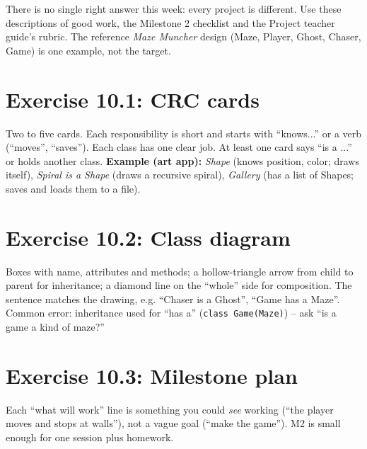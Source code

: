 
\begin{teachernote}
There is no single right answer this week: every project is different. Use these descriptions of good work, the Milestone 2 checklist and the Project teacher guide's rubric. The reference \emph{Maze Muncher} design (Maze, Player, Ghost, Chaser, Game) is one example, not the target.
\end{teachernote}

\section{Exercise 10.1: CRC cards}
\begin{answer}
Two to five cards. Each responsibility is short and starts with \enquote{knows...} or a verb (\enquote{moves}, \enquote{saves}). Each class has one clear job. At least one card says \enquote{is a ...} or holds another class. \textbf{Example (art app):} \emph{Shape} (knows position, color; draws itself), \emph{Spiral is a Shape} (draws a recursive spiral), \emph{Gallery} (has a list of Shapes; saves and loads them to a file).
\end{answer}

\section{Exercise 10.2: Class diagram}
\begin{answer}
Boxes with name, attributes and methods; a hollow-triangle arrow from child to parent for inheritance; a diamond line on the \enquote{whole} side for composition. The sentence matches the drawing, e.g. \enquote{Chaser is a Ghost}, \enquote{Game has a Maze}. Common error: inheritance used for \enquote{has a} (\texttt{class Game(Maze)}) -- ask \enquote{is a game a kind of maze?}
\end{answer}

\section{Exercise 10.3: Milestone plan}
\begin{answer}
Each \enquote{what will work} line is something you could \emph{see} working (\enquote{the player moves and stops at walls}), not a vague goal (\enquote{make the game}). M2 is small enough for one session plus homework.
\end{answer}

